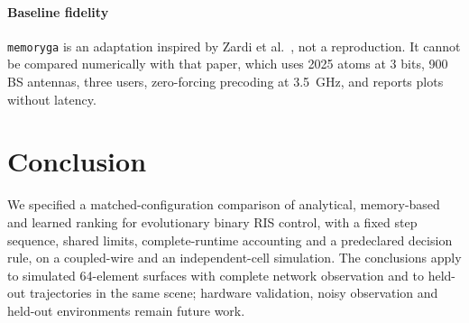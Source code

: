 \documentclass[conference]{IEEEtran}
\newcommand{\mth}[1]{\begingroup\renewcommand{\_}{\textunderscore\allowbreak}\texttt{#1}\endgroup}
\begin{document}
\paragraph{Baseline fidelity} \mth{memory\_ga} is an adaptation inspired by Zardi et al.~\cite{zardi}, not a reproduction. It cannot be compared numerically with that paper, which uses 2025 atoms at 3 bits, 900 BS antennas, three users, zero-forcing precoding at 3.5~GHz, and reports plots without latency.

\section{Conclusion}\label{sec:conclusion}
We specified a matched-configuration comparison of analytical, memory-based and learned ranking for evolutionary binary RIS control, with a fixed step sequence, shared limits, complete-runtime accounting and a predeclared decision rule, on a coupled-wire and an independent-cell simulation. \resConclusionOutcome{} The conclusions apply to simulated 64-element surfaces with complete network observation and to held-out trajectories in the same scene; hardware validation, noisy observation and held-out environments remain future work.



\end{document}
